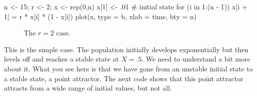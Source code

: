\documentclass[
  a4paper,
  DIV=11,
  numbers=noendperiod,
  oneside]{scrreprt}
\newenvironment{Shaded}{}{}
\newcommand{\AttributeTok}[1]{\textcolor[rgb]{0.84,0.23,0.29}{#1}}
\newcommand{\CommentTok}[1]{\textcolor[rgb]{0.42,0.45,0.49}{#1}}
\newcommand{\ControlFlowTok}[1]{\textcolor[rgb]{0.84,0.23,0.29}{#1}}
\newcommand{\DecValTok}[1]{\textcolor[rgb]{0.00,0.36,0.77}{#1}}
\newcommand{\FunctionTok}[1]{\textcolor[rgb]{0.44,0.26,0.76}{#1}}
\newcommand{\NormalTok}[1]{\textcolor[rgb]{0.14,0.16,0.18}{#1}}
\newcommand{\OtherTok}[1]{\textcolor[rgb]{0.44,0.26,0.76}{#1}}
\newcommand{\SpecialCharTok}[1]{\textcolor[rgb]{0.00,0.36,0.77}{#1}}
\newcommand{\StringTok}[1]{\textcolor[rgb]{0.01,0.18,0.38}{#1}}
\begin{document}
\begin{Shaded}
\begin{Highlighting}[]
\NormalTok{n }\OtherTok{\textless{}{-}} \DecValTok{15}\NormalTok{; r }\OtherTok{\textless{}{-}} \DecValTok{2}\NormalTok{; x }\OtherTok{\textless{}{-}} \FunctionTok{rep}\NormalTok{(}\DecValTok{0}\NormalTok{,n)}
\NormalTok{x[}\DecValTok{1}\NormalTok{] }\OtherTok{\textless{}{-}}\NormalTok{ .}\DecValTok{01} \CommentTok{\# initial state}
\ControlFlowTok{for}\NormalTok{ (i }\ControlFlowTok{in} \DecValTok{1}\SpecialCharTok{:}\NormalTok{(n }\SpecialCharTok{{-}} \DecValTok{1}\NormalTok{))}
\NormalTok{  x[i }\SpecialCharTok{+} \DecValTok{1}\NormalTok{] }\OtherTok{=}\NormalTok{ r }\SpecialCharTok{*}\NormalTok{ x[i] }\SpecialCharTok{*}\NormalTok{ (}\DecValTok{1} \SpecialCharTok{{-}}\NormalTok{ x[i])}
\FunctionTok{plot}\NormalTok{(x, }\AttributeTok{type =} \StringTok{\textquotesingle{}b\textquotesingle{}}\NormalTok{, }\AttributeTok{xlab =} \StringTok{\textquotesingle{}time\textquotesingle{}}\NormalTok{, }\AttributeTok{bty =} \StringTok{\textquotesingle{}n\textquotesingle{}}\NormalTok{)}
\end{Highlighting}
\end{Shaded}

\begin{figure}


\caption{\label{fig-ch2-img2}The \(r=2\) case.}

\end{figure}%

This is the simple case. The population initially develops exponentially
but then levels off and reaches a stable state at \(X = .5\). We need to
understand a bit more about it. What you see here is that we have gone
from an unstable initial state to a stable state, a point attractor. The
next code shows that this point attractor attracts from a wide range of
initial values, but not all.
\end{document}
